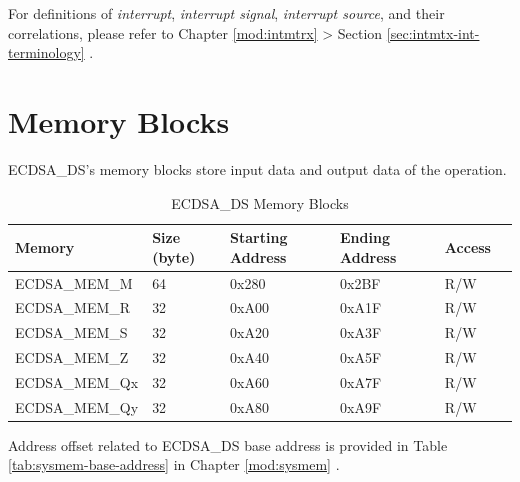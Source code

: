 \documentclass[main\_\_EN.tex]{subfiles}
\begin{document}
\begin{tiplisting}
For definitions of \textit{interrupt}, \textit{interrupt signal}, \textit{interrupt source}, and their correlations, please refer to Chapter \ref{mod:intmtrx} \textit{} > Section \ref{sec:intmtx-int-terminology} \textit{}.
\end{tiplisting}

\newpage
\section{Memory Blocks}

ECDSA\_DS's memory blocks store input data and output data of the operation.

\begin{table}[H]
    \centering
    \caption{ECDSA\_DS Memory Blocks} \label{tab:ecdsa-memory}
    \begin{threeparttable}
    \begin{tabular}{ | l | l | l | l | l | l | }
    \hline
        \rowcolor{lightgray}
        \textbf{Memory} & \textbf{Size (byte)}  &  \textbf{Starting Address}\tnote{*} &  \textbf{Ending Address} \tnote{*} & \textbf{Access}   \\ \hline
        ECDSA\_MEM\_M    & 64  & 0x280 & 0x2BF & R/W \\ \hline
        ECDSA\_MEM\_R    & 32  & 0xA00 & 0xA1F & R/W \\ \hline
        ECDSA\_MEM\_S    & 32  & 0xA20 & 0xA3F & R/W \\ \hline
        ECDSA\_MEM\_Z    & 32  & 0xA40 & 0xA5F & R/W \\ \hline
        ECDSA\_MEM\_Qx   & 32  & 0xA60 & 0xA7F & R/W \\ \hline
        ECDSA\_MEM\_Qy   & 32  & 0xA80 & 0xA9F & R/W \\ \hline
    \end{tabular}
    \begin{tablenotes}
        \item[*] Address offset related to ECDSA\_DS base address is provided in Table \ref{tab:sysmem-base-address} in Chapter \ref{mod:sysmem} \textit{}.
    \end{tablenotes}
    \end{threeparttable}
\end{table}


\end{document}
